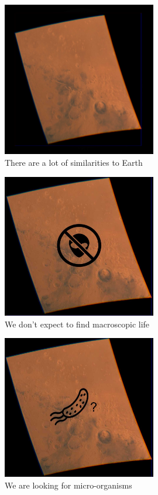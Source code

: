 \documentclass[]{article}
\begin{document}
\begin{figure}[H]
	\caption{There are a lot of similarities to Earth}\label{fig:mars:2}
	\includegraphics[width=0.6\textwidth]{Mars2}
\end{figure}

\begin{figure}[H]
	\caption{We don't expect to find macroscopic life}\label{fig:mars:3}
	\includegraphics[width=0.6\textwidth]{Mars3}
\end{figure}

\begin{figure}[H]
	\caption{We are looking for micro-organisms}\label{fig:mars:4}
	\includegraphics[width=0.6\textwidth]{Mars4}
\end{figure}
\end{document}
